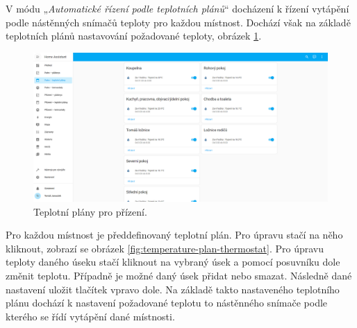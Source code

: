 
\begin{Czech}
\end{Czech}

\begin{Czech}
V módu „\textit{Automatické řízení podle teplotních plánů}“ docházení k řízení vytápění podle nástěnných snímačů teploty pro každou místnost. Dochází však na základě teplotních plánů nastavování požadované teploty, obrázek \ref{fig:temperature-plan-ground-floor}.
\end{Czech}

\begin{Czech}
\begin{figure}[H]
    \centering
    \includegraphics[width=1\textwidth]{pictures/czech/software/temperature-plan-ground-floor.png}
    \caption{Teplotní plány pro přízení.}
    \label{fig:temperature-plan-ground-floor}
\end{figure}
\end{Czech}

\begin{Czech}
Pro každou místnost je předdefinovaný teplotní plán. Pro úpravu stačí na něho kliknout, zobrazí se obrázek \ref{fig:temperature-plan-thermostat}. Pro úpravu teploty daného úseku stačí kliknout na vybraný úsek a pomocí posuvníku dole změnit teplotu. Případně je možné daný úsek přidat nebo smazat. Následně dané nastavení uložit tlačítek vpravo dole. Na základě takto nastaveného teplotního plánu dochází k nastavení požadované teplotu to nástěnného snímače podle kterého se řídí  vytápění dané místnosti.
\end{Czech}

